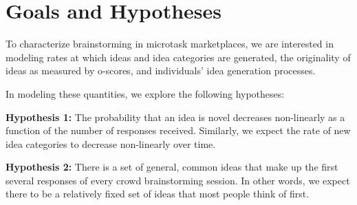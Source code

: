 \section{Goals and Hypotheses}



To characterize brainstorming in microtask marketplaces, we are interested in modeling rates at which ideas and idea categories are generated, the originality of ideas as measured by o-scores, and individuals' idea generation processes.



In modeling these quantities, we explore the following hypotheses:

\textbf{Hypothesis 1:} The probability that an idea is novel decreases non-linearly as a function of the number of responses received. Similarly, we expect the rate of new idea categories to decrease non-linearly over time.

\textbf{Hypothesis 2:} There is a set of general, common ideas that make up the first several responses of every crowd brainstorming session. In other words, we expect there to be a relatively fixed set of ideas that most people think of first.



